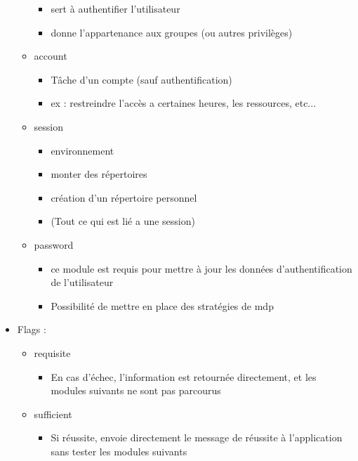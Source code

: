 \documentclass[a4paper]{article}
\begin{document}
\begin{itemize}[label = \textbullet, font = \Large]
\begin{itemize}[label=, font=\scriptsize]
          \begin{itemize}
            \item sert à authentifier l'utilisateur
            \item donne l'appartenance aux groupes (ou autres privilèges)
          \end{itemize}
          \item account
          \begin{itemize}
            \item Tâche d'un compte (sauf authentification)
            \item ex : restreindre l'accès a certaines heures, les ressources, etc...
          \end{itemize}
          \item session
          \begin{itemize}
            \item environnement
            \item monter des répertoires
            \item création d'un répertoire personnel
            \item (Tout ce qui est lié a une session)
          \end{itemize}
          \item password
          \begin{itemize}
            \item ce module est requis pour mettre à jour les données d’authentification de l’utilisateur
            \item Possibilité de mettre en place des stratégies de mdp
          \end{itemize}
        \end{itemize}
        \item Flags :
        \begin{itemize}[label=, font=\scriptsize] 
          \item requisite
          \begin{itemize}
            \item En cas d’échec, l’information est retournée directement, et les modules suivants ne sont pas parcourus
          \end{itemize}
          \item sufficient
          \begin{itemize}
            \item Si réussite, envoie directement le message de réussite à l’application sans tester les modules suivants

\end{itemize}
\end{itemize}
\end{itemize}
\end{document}
